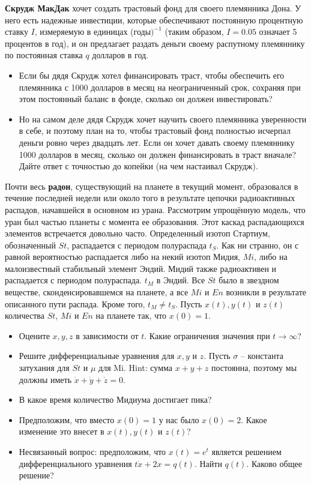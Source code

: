 \begin{task}
\textbf{Скрудж МакДак} хочет создать трастовый фонд для своего племянника Дона. У него есть надежные инвестиции, которые обеспечивают постоянную процентную ставку $I$, измеряемую в единицах (годы$)^{−1}$ (таким образом, $I = 0.05$ означает 5 процентов в год), и он предлагает раздать деньги своему распутному племяннику по постоянная ставка $q$ долларов в год.
\begin{itemize}
    \item Если бы дядя Скрудж хотел финансировать траст, чтобы обеспечить его племянника с 1000 долларов в месяц на неограниченный срок, сохраняя при этом постоянный баланс в фонде, сколько он должен инвестировать?
    \item Но на самом деле дядя Скрудж хочет научить своего племянника уверенности в себе, и поэтому план на то, чтобы трастовый фонд полностью исчерпал деньги ровно через двадцать лет. Если он хочет давать своему племяннику 1000 долларов в месяц, сколько он должен финансировать в траст вначале? Дайте ответ с точностью до копейки (на чем настаивал Скрудж).
\end{itemize}

\end{task}

\begin{task}
Почти весь \textbf{радон}, существующий на планете в текущий момент, образовался в течение последней недели или около того в результате цепочки радиоактивных распадов, начавшейся в основном из урана. Рассмотрим упрощённую модель, что уран был частью планеты с момента ее образования. Этот каскад распадающихся элементов встречается довольно часто. 
Определенный изотоп Стартиум, обозначенный $St$, распадается с периодом полураспада $t_S$. Как ни странно, он с равной вероятностью распадается либо на некий изотоп Мидия, $Mi$, либо на малоизвестный стабильный элемент Эндий. Мидий также радиоактивен и распадается с периодом полураспада.
$t_M$ в Эндий. Все $St$ было в звездном веществе, сконденсировавшемся на планете, а все $Mi$ и $En$ возникли в результате описанного пути распада. Кроме того, $t_M \neq t_S$.
Пусть $x(t), y(t)$ и $z(t)$ количества $St$, $Mi$ и $En$ на планете так, что $x(0) = 1$.
\begin{itemize}
    \item Оцените $x, y, z$ в зависимости от $t$. Какие ограничения
значения при $t \to \infty$?
    \item Решите дифференциальные уравнения для $x, y$ и $z$. Пусть $\sigma$ -- константа затухания для $St$ и $\mu$ для Mi. Hint: сумма $x+y+z$ постоянна, поэтому мы должны иметь $\dot{x}+\dot{y} +\dot{z} = 0$.
    \item В какое время количество Мидиума достигает пика?
    \item Предположим, что вместо $x(0) = 1$ у нас было $x(0) = 2$. Какое изменение это внесет в $x(t), y(t)$ и $z(t)$?
    \item Несвязанный вопрос: предположим, что $x(t) = e^t$ является решением дифференциального уравнения $t\dot{x} + 2x = q(t)$. Найти $q(t)$. Каково общее решение?
\end{itemize} 

\end{task}

